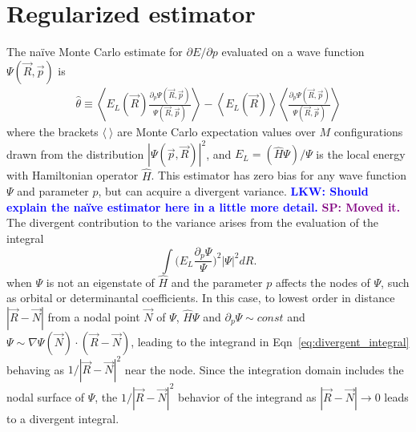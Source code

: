 \documentclass[twocolumn]{revtex4-1}
\newcommand{\lucas}[1]{\textbf{\textcolor{blue}{LKW: #1}}}
\newcommand{\shivesh}[1]{\textbf{\textcolor{purple}{SP: #1}}}
\begin{document}
\section{Regularized estimator}
The na\"ive Monte Carlo estimate for $\partial E/\partial p$ evaluated on a wave function $\Psi(\vec{R}, \vec{p})$ is 
\begin{equation}
\begin{split}
\hat{\theta} \equiv \left\langle E_L(\vec{R}) \frac{\partial_p \Psi(\vec{R}, \vec{p})}{\Psi(\vec{R}, \vec{p})} \right\rangle - \left\langle E_L(\vec{R}) \right \rangle \left \langle \frac{\partial_p \Psi(\vec{R},\vec{p})}{\Psi(\vec{R},\vec{p})}\right\rangle 
\end{split}
\label{eq:naive_estimator}
\end{equation} 
where the brackets $\langle \ \rangle$ are Monte Carlo expectation values over $M$ configurations drawn from the distribution $|\Psi(\vec{p}, \vec{R})|^2$, and $E_L = (\hat{H}\Psi)/\Psi$ is the local energy with Hamiltonian operator $\hat{H}$.
This estimator has zero bias for any wave function $\Psi$ and parameter $p$, but can acquire a divergent variance.
\lucas{Should explain the na\"ive estimator here in a little more detail.}
\shivesh{Moved it.}
The divergent contribution to the variance arises from the evaluation of the integral
\begin{equation}
\int \Big(E_L\frac{\partial_p\Psi}{\Psi}\Big)^2 |\Psi|^2 dR.
\label{eq:divergent_integral}
\end{equation}
when $\Psi$ is not an eigenstate of $\hat{H}$ and the parameter $p$ affects the nodes of $\Psi$, such as orbital or determinantal coefficients.
In this case, to lowest order in distance $|\vec{R}-\vec{N}|$ from a nodal point $\vec{N}$ of $\Psi$, $\hat{H}\Psi$ and $\partial_p \Psi \sim const$ and $\Psi \sim \nabla \Psi(\vec{N}) \cdot (\vec{R} - \vec{N})$, leading to the integrand in Eqn~\ref{eq:divergent_integral} behaving as $1/|\vec{R}-\vec{N}|^2$ near the node.
Since the integration domain includes the nodal surface of $\Psi$, the $1/|\vec{R}-\vec{N}|^2$ behavior of the integrand as $|\vec{R}-\vec{N}|\rightarrow 0$ leads to a divergent integral.
\end{document}
